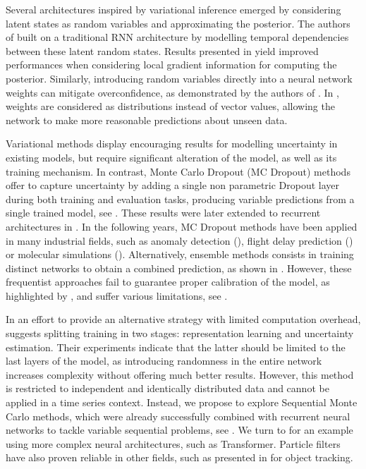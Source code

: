 \documentclass{article}
\begin{document}
Several architectures inspired by variational inference emerged by considering latent states as random variables and approximating the posterior.
The authors of \cite{Chung2015NIPS} built on a traditional RNN architecture by modelling temporal dependencies between these latent random states.
Results presented in \cite{Fortunato2017bayesian} yield improved performances when considering local gradient information for computing the posterior.
Similarly, introducing random variables directly into a neural network weights can mitigate overconfidence, as demonstrated by the authors of \cite{Hinton1993}.
In \cite{Blundell2015}, weights are considered as distributions instead of vector values, allowing the network to make more reasonable predictions about unseen data.

Variational methods display encouraging results for modelling uncertainty in existing models, but require significant alteration of the model, as well as its training mechanism.
In contrast, Monte Carlo Dropout (MC Dropout) methods offer to capture uncertainty by adding a single non parametric Dropout layer during both training and evaluation tasks, producing variable predictions from a single trained model, see \cite{Gal2016}.
These results were later extended to recurrent architectures in \cite{Gal2016NIPS}.
In the following years, MC Dropout methods have been applied in many industrial fields, such as anomaly detection (\cite{Zhu2017DeepAC}), flight delay prediction (\cite{Vandal2018}) or molecular simulations (\cite{Wen2020UncertaintyQI}).
Alternatively, ensemble methods consists in training distinct networks to obtain a combined prediction, as shown in \cite{Pearce2018}.
However, these frequentist approaches fail to guarantee proper calibration of the model, as highlighted by \cite{ashukha2020pitfalls}, and suffer various limitations, see \cite{Fong2020}.

In an effort to provide an alternative strategy with limited computation overhead, \cite{Brosse2020OnLA} suggests splitting training in two stages: representation learning and uncertainty estimation.
Their experiments indicate that the latter should be limited to the last layers of the model, as introducing randomness in the entire network increases complexity without offering much better results. However, this method is restricted to independent and identically distributed data and cannot be applied in a time series context.
Instead, we propose to explore Sequential Monte Carlo methods, which were already successfully combined with recurrent neural networks to tackle variable sequential problems, see \cite{Ma2020}.
We turn to \cite{Martin2020TheMC} for an example using more complex neural architectures, such as Transformer.
Particle filters have also proven reliable in other fields, such as presented in \cite{Liu2020LSTMPF} for object tracking.
\end{document}
